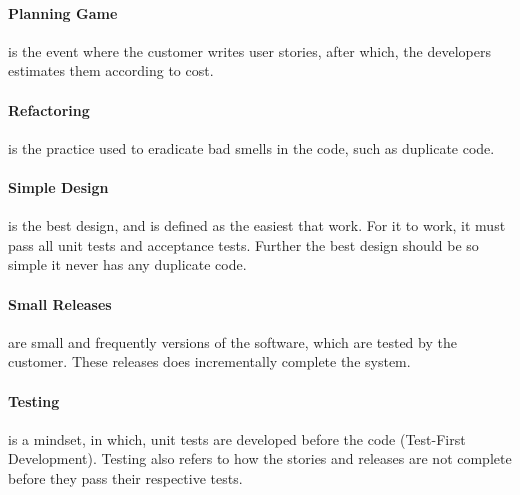 \paragraph{Planning Game} is the event where the customer writes user stories, after which, the developers estimates them according to cost.

\paragraph{Refactoring} is the practice used to eradicate bad smells in the code, such as duplicate code.


\paragraph{Simple Design} is the best design, and is defined as the easiest that work.
For it to work, it must pass all unit tests and acceptance tests.
Further the best design should be so simple it never has any duplicate code.


\paragraph{Small Releases} are small and frequently versions of the software, which are tested by the customer.
These releases does incrementally complete the system.

\paragraph{Testing} is a mindset, in which, unit tests are developed before the code (Test-First Development).
Testing also refers to how the stories and releases are not complete before they pass their respective tests.

